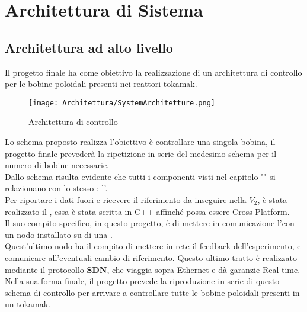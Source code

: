 \chapter{Architettura di Sistema}\label{cap:Architettura}



\section{Architettura ad alto livello}
Il progetto finale ha come obiettivo la realizzazione di un architettura di controllo per le bobine poloidali presenti nei reattori tokamak.

\begin{figure}[h]
	\centering
	\texttt{[image: Architettura/SystemArchitetture.png]}
	\caption[Schema finale dell'archiettettura di controllo]{Architettura di controllo}
\end{figure}

\noindent
Lo schema proposto realizza l'obiettivo è controllare una singola bobina, il progetto finale prevederà la ripetizione in serie del medesimo schema per il numero di bobine necessarie.\\

Dallo schema risulta evidente che tutti i componenti visti nel capitolo "" si relazionano con lo stesso \microControllore: l'\ArduinoUno.\\
Per riportare i dati fuori e ricevere il riferimento da inseguire nella $V_2$, è stata realizzato il , essa è stata scritta in C++ affinché possa essere Cross-Platform.\\
Il suo compito specifico, in questo progetto, è di mettere in comunicazione l'\ArduinoUno con un nodo \MARTe installato su di una \Rasp.\\
Quest'ultimo nodo ha il compito di mettere in rete il feedback dell'esperimento, e comunicare all'\ArduinoUno eventuali cambio di riferimento. Questo ultimo tratto è realizzato mediante il protocollo \textbf{SDN}, che viaggia sopra Ethernet e dà garanzie Real-time.\\
Nella sua forma finale, il progetto prevede la riproduzione in serie di questo schema di controllo per arrivare a controllare tutte le bobine poloidali presenti in un tokamak.

